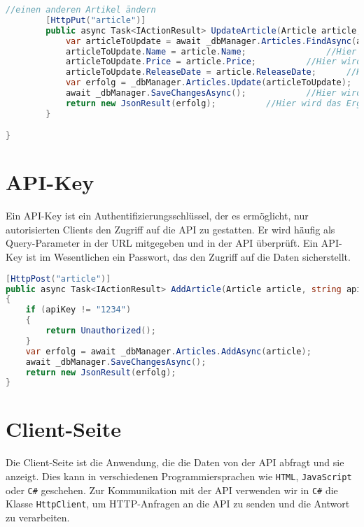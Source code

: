 \documentclass[a4paper,12pt]{report}
\begin{document}
\begin{lstlisting}[language=csharp, caption=Beispiel für einen API-Controller in C\#]
        //einen anderen Artikel ändern
        [HttpPut("article")]
        public async Task<IActionResult> UpdateArticle(Article article, string apiKey){
            var articleToUpdate = await _dbManager.Articles.FindAsync(article.ArticleId);   //Hier wird der Artikel mit der ID geholt
            articleToUpdate.Name = article.Name;                //Hier wird der Name geändert
            articleToUpdate.Price = article.Price;          //Hier wird der Preis geändert
            articleToUpdate.ReleaseDate = article.ReleaseDate;      //Hier wird das Release Date geändert
            var erfolg = _dbManager.Articles.Update(articleToUpdate);       //Hier wird der Artikel geupdatet
            await _dbManager.SaveChangesAsync();            //Hier wird die Änderung in der Datenbank gespeichert
            return new JsonResult(erfolg);          //Hier wird das Ergebnis zurückgegeben -> true oder false
        }

}
\end{lstlisting}

\section{API-Key}
Ein API-Key ist ein Authentifizierungsschlüssel, der es ermöglicht, nur autorisierten Clients den Zugriff auf die API zu gestatten. Er wird häufig als Query-Parameter in der URL mitgegeben und in der API überprüft. Ein API-Key ist im Wesentlichen ein Passwort, das den Zugriff auf die Daten sicherstellt.

\begin{lstlisting}[language=csharp, caption=Beispiel für einen API-Controller in C\#]
    [HttpPost("article")]
public async Task<IActionResult> AddArticle(Article article, string apiKey)
{
    if (apiKey != "1234")
    {
        return Unauthorized();
    }
    var erfolg = await _dbManager.Articles.AddAsync(article);
    await _dbManager.SaveChangesAsync();
    return new JsonResult(erfolg);
}
\end{lstlisting}

\section{Client-Seite}
Die Client-Seite ist die Anwendung, die die Daten von der API abfragt und sie anzeigt. Dies kann in verschiedenen Programmiersprachen wie \texttt{HTML}, \texttt{JavaScript} oder \texttt{C\#} geschehen. Zur Kommunikation mit der API verwenden wir in \texttt{C\#} die Klasse \texttt{HttpClient}, um HTTP-Anfragen an die API zu senden und die Antwort zu verarbeiten.
\end{document}
